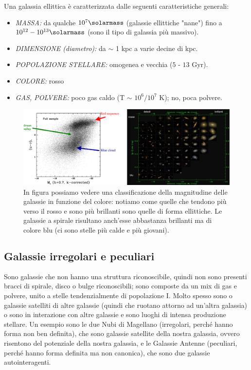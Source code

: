 Una galassia ellittica è caratterizzata dalle seguenti caratteristiche generali:
\begin{itemize}
	\item \emph{MASSA:} da qualche $10^7 \si{\solarmass}$ (galassie ellittiche "nane") fino a $10^{12} - 10^{13} \si{\solarmass}$ (sono il tipo di galassia più massivo).
	\item \emph{DIMENSIONE (diametro):} da $\sim$ 1 kpc a varie decine di kpc.
	\item \emph{POPOLAZIONE STELLARE:} omogenea e vecchia ($5$ - $13$ Gyr).
	\item \emph{COLORE:} rosso
	\item \emph{GAS, POLVERE:} poco gas caldo (T $\sim$ $10^6/10^7$ K); no, poca polvere.
\end{itemize}

\begin{figure}
	\centering
	\includegraphics[width = \textwidth]{immagini/galassie-colore-magnitudine.png}
	\caption{In figura possiamo vedere una classificazione della magnitudine delle galassie in funzione del colore: notiamo come quelle che tendono più verso il rosso e sono più brillanti sono quelle di forma ellittiche. Le galassie a spirale risultano anch'esse abbastanza brillanti ma di colore blu (ci sono stelle più calde e più giovani).}
	\label{fig:galassie-colore-magnitudine}
\end{figure}

\subsection{Galassie irregolari e peculiari}
Sono galassie che non hanno una struttura riconoscibile, quindi non sono presenti bracci di spirale, disco o bulge riconoscibili; sono composte da un mix di gas e polvere, unito a stelle tendenzialmente di popolazione I. Molto spesso sono o galassie satelliti di altre galassie (quindi che ruotano attorno ad un'altra galassia) o sono in interazione con altre galassie e sono luoghi di intensa produzione stellare. Un esempio sono le due Nubi di Magellano (irregolari, perché hanno forma non ben definita), che sono galassie satellite della nostra galassia, ovvero risentono del potenziale della nostra galassia, e le Galassie Antenne (peculiari, perché hanno forma definita ma non canonica), che sono due galassie autointeragenti.

